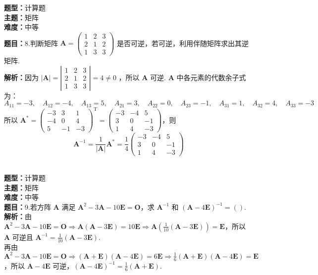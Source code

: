 \documentclass{ctexart}
\newenvironment{question}[5]{%
	\noindent\textbf{题型：}#1\\
	\textbf{主题：}#2\\
	\textbf{难度：}#3\\
	\textbf{题目：}#4\\
	\textbf{解析：}#5\\
	\vspace{1em}
}{}
\begin{document}
	\begin{question}
		{计算题}
		{矩阵}
		{中等}
		{8.判断矩阵 \(\mathbf{A}=\left(\begin{array}{lll}1 & 2 & 3 \\ 2 & 1 & 2 \\ 1 & 3 & 3\end{array}\right)\) 是否可逆，若可逆，利用伴随矩阵求出其逆矩阵. }
		{因为 \(|\mathbf{A}|=\left|\begin{array}{lll}1 & 2 & 3 \\ 2 & 1 & 2 \\ 1 & 3 & 3\end{array}\right|=4 \neq 0\) ，所以 \(\mathbf{A}\) 可逆.  \(\mathbf{A}\) 中各元素的代数余子式为：
			\[
			A_{11}=-3,\quad A_{12}=-4,\quad A_{13}=5,\quad A_{21}=3,\quad A_{22}=0,\quad A_{23}=-1,\quad A_{31}=1,\quad A_{32}=4,\quad A_{33}=-3
			\]
			所以 \(\mathbf{A}^*=\left(\begin{array}{ccc}-3 & 3 & 1 \\ -4 & 0 & 4 \\ 5 & -1 & -3\end{array}\right)^{\mathrm{T}}=\left(\begin{array}{ccc}-3 & -4 & 5 \\ 3 & 0 & -1 \\ 1 & 4 & -3\end{array}\right)\)，则
			\[
			\mathbf{A}^{-1}=\frac{1}{|\mathbf{A}|}\mathbf{A}^*=\frac{1}{4}\left(\begin{array}{ccc}-3 & -4 & 5 \\ 3 & 0 & -1 \\ 1 & 4 & -3\end{array}\right)
			\]}
	\end{question}
	
	
	\begin{question}
		{计算题}
		{矩阵}
		{中等}
		{9.若方阵 \(\mathbf{A}\) 满足 \(\mathbf{A}^2 - 3\mathbf{A} - 10\mathbf{E} = \mathbf{O}\)，求 \(\mathbf{A}^{-1}\) 和 \((\mathbf{A} - 4\mathbf{E})^{-1} = ()\). }
		{由 \(\mathbf{A}^2 - 3\mathbf{A} - 10\mathbf{E} = \mathbf{O} \Rightarrow \mathbf{A}(\mathbf{A} - 3\mathbf{E}) = 10\mathbf{E} \Rightarrow \mathbf{A} \left( \frac{1}{10}(\mathbf{A} - 3\mathbf{E}) \right) = \mathbf{E}\)，所以 \(\mathbf{A}\) 可逆且 \(\mathbf{A}^{-1} = \frac{1}{10}(\mathbf{A} - 3\mathbf{E})\). \\
			再由 \(\mathbf{A}^2 - 3\mathbf{A} - 10\mathbf{E} = \mathbf{O} \Rightarrow (\mathbf{A} + \mathbf{E})(\mathbf{A} - 4\mathbf{E}) = 6\mathbf{E} \Rightarrow \frac{1}{6}(\mathbf{A} + \mathbf{E})(\mathbf{A} - 4\mathbf{E}) = \mathbf{E}\)，所以 \(\mathbf{A} - 4\mathbf{E}\) 可逆，\((\mathbf{A} - 4\mathbf{E})^{-1} = \frac{1}{6}(\mathbf{A} + \mathbf{E})\). }
	\end{question}
	
\end{document}
